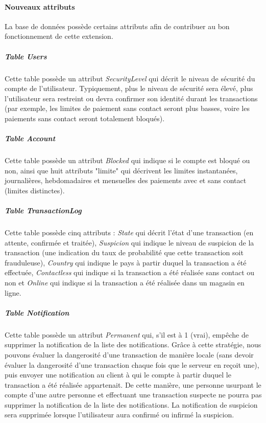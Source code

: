\paragraph{Nouveaux attributs} La base de données possède certains attributs afin de contribuer au bon fonctionnement de cette extension.

\subparagraph{Table \emph{Users}} Cette table possède un attribut \emph{SecurityLevel} qui décrit le niveau de sécurité du compte de l'utilisateur. Typiquement, plus le niveau de sécurité sera élevé, plus l'utilisateur sera restreint ou devra confirmer son identité durant les transactions (par exemple, les limites de paiement sans contact seront plus basses, voire les paiements sans contact seront totalement bloqués).

\subparagraph{Table \emph{Account}} Cette table possède un attribut \emph{Blocked} qui indique si le compte est bloqué ou non, ainsi que huit attributs "limite" qui décrivent les limites instantanées, journalières, hebdomadaires et mensuelles des paiements avec et sans contact (limites distinctes).

\subparagraph{Table \emph{TransactionLog}} Cette table possède cinq attributs : \emph{State} qui décrit l'état d'une transaction (en attente, confirmée et traitée), \emph{Suspicion} qui indique le niveau de suspicion de la transaction (une indication du taux de probabilité que cette transaction soit frauduleuse), \emph{Country} qui indique le pays à partir duquel la transaction a été effectuée, \emph{Contactless} qui indique si la transaction a été réalisée sans contact ou non et \emph{Online} qui indique si la transaction a été réalisée dans un magasin en ligne.

\subparagraph{Table \emph{Notification}} Cette table possède un attribut \emph{Permanent} qui, s'il est à 1 (vrai), empêche de supprimer la notification de la liste des notifications. Grâce à cette stratégie, nous pouvons évaluer la dangerosité d'une transaction de manière locale (sans devoir évaluer la dangerosité d'une transaction chaque fois que le serveur en reçoit une), puis envoyer une notification au client à qui le compte à partir duquel le transaction a été réalisée appartenait. De cette manière, une personne usurpant le compte d'une autre personne et effectuant une transaction suspecte ne pourra pas supprimer la notification de la liste des notifications. La notification de suspicion sera supprimée lorsque l'utilisateur aura confirmé ou infirmé la suspicion.